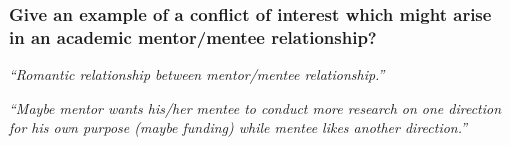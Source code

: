\documentclass[12pt]{beamer}
\newcommand\ans[1]{{\it ``#1''}}
\newcommand\gap{\vspace{5mm}}
\begin{document}
\begin{frame}

 




\end{frame}

\begin{frame}   %

\frametitle{ 
Give an example of a conflict of interest which might arise in an academic mentor/mentee relationship?
}

\ans{Romantic relationship between mentor/mentee relationship.}

\gap

\ans{Maybe mentor wants his/her mentee to conduct more research on one direction for his own purpose (maybe funding) while mentee likes another direction.}







\end{frame} 
\end{document}
